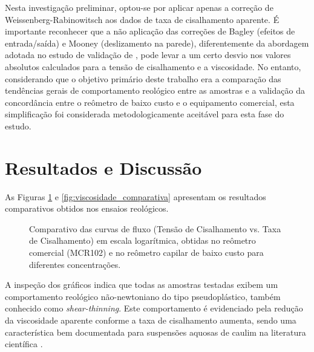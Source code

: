 \documentclass[article,12pt,oneside,a4paper,english,brazil,sumario=tradicional]{abntex2}
\begin{document}
Nesta investigação preliminar, optou-se por aplicar apenas a correção de Weissenberg-Rabinowitsch aos dados de taxa de cisalhamento aparente. É importante reconhecer que a não aplicação das correções de Bagley (efeitos de entrada/saída) e Mooney (deslizamento na parede), diferentemente da abordagem adotada no estudo de validação de , pode levar a um certo desvio nos valores absolutos calculados para a tensão de cisalhamento e a viscosidade. No entanto, considerando que o objetivo primário deste trabalho era a comparação das tendências gerais de comportamento reológico entre as amostras e a validação da concordância entre o reômetro de baixo custo e o equipamento comercial, esta simplificação foi considerada metodologicamente aceitável para esta fase do estudo.

\section{Resultados e Discussão}
\label{sec:resultados}
As Figuras \ref{fig:fluxo_comparativo} e \ref{fig:viscosidade_comparativa} apresentam os resultados comparativos obtidos nos ensaios reológicos.

\begin{figure}[htbp]
    \centering
    \caption{Comparativo das curvas de fluxo (Tensão de Cisalhamento vs. Taxa de Cisalhamento) em escala logarítmica, obtidas no reômetro comercial (MCR102) e no reômetro capilar de baixo custo para diferentes concentrações.}
    \label{fig:fluxo_comparativo}
\end{figure}

A inspeção dos gráficos indica que todas as amostras testadas exibem um comportamento reológico não-newtoniano do tipo pseudoplástico, também conhecido como \textit{shear-thinning}. Este comportamento é evidenciado pela redução da viscosidade aparente conforme a taxa de cisalhamento aumenta, sendo uma característica bem documentada para suspensões aquosas de caulim na literatura científica .
\end{document}
